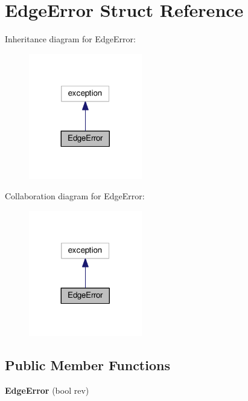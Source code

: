 \hypertarget{structEdgeError}{\section{Edge\+Error Struct Reference}
\label{structEdgeError}
}


Inheritance diagram for Edge\+Error\+:\nopagebreak
\begin{figure}[H]
\begin{center}
\leavevmode
\includegraphics[width=140pt]{structEdgeError__inherit__graph}
\end{center}
\end{figure}


Collaboration diagram for Edge\+Error\+:\nopagebreak
\begin{figure}[H]
\begin{center}
\leavevmode
\includegraphics[width=140pt]{structEdgeError__coll__graph}
\end{center}
\end{figure}
\subsection*{Public Member Functions}
\begin{DoxyCompactItemize}
\item 
\hypertarget{structEdgeError_a92ca9588f65b2b4d17139ff80eb29ab3}{{\bfseries Edge\+Error} (bool rev)}\label{structEdgeError_a92ca9588f65b2b4d17139ff80eb29ab3}

\end{DoxyCompactItemize}
